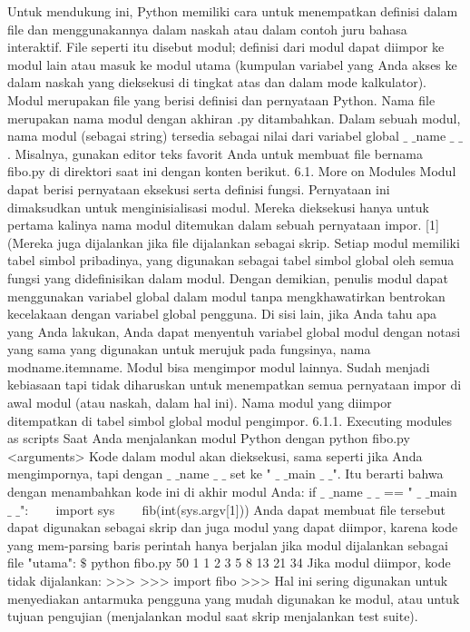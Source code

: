 Untuk mendukung ini, Python memiliki cara untuk menempatkan definisi dalam file dan menggunakannya dalam naskah atau dalam contoh juru bahasa interaktif. File seperti itu disebut modul; definisi dari modul dapat diimpor ke modul lain atau masuk ke modul utama (kumpulan variabel yang Anda akses ke dalam naskah yang dieksekusi di tingkat atas dan dalam mode kalkulator).
Modul merupakan file yang berisi definisi dan pernyataan Python. Nama file merupakan nama modul dengan akhiran .py ditambahkan. Dalam sebuah modul, nama modul (sebagai string) tersedia sebagai nilai dari variabel global  $  \_  $ $  \_  $name $  \_  $ $  \_  $. Misalnya, gunakan editor teks favorit Anda untuk membuat file bernama fibo.py di direktori saat ini dengan konten berikut. 
6.1. More on Modules 
Modul dapat berisi pernyataan eksekusi serta definisi fungsi. Pernyataan ini dimaksudkan untuk menginisialisasi modul. Mereka dieksekusi hanya untuk pertama kalinya nama modul ditemukan dalam sebuah pernyataan impor. [1] (Mereka juga dijalankan jika file dijalankan sebagai skrip.
Setiap modul memiliki tabel simbol pribadinya, yang digunakan sebagai tabel simbol global oleh semua fungsi yang didefinisikan dalam modul. Dengan demikian, penulis modul dapat menggunakan variabel global dalam modul tanpa mengkhawatirkan bentrokan kecelakaan dengan variabel global pengguna. Di sisi lain, jika Anda tahu apa yang Anda lakukan, Anda dapat menyentuh variabel global modul dengan notasi yang sama yang digunakan untuk merujuk pada fungsinya, nama modname.itemname.
Modul bisa mengimpor modul lainnya. Sudah menjadi kebiasaan tapi tidak diharuskan untuk menempatkan semua pernyataan impor di awal modul (atau naskah, dalam hal ini). Nama modul yang diimpor ditempatkan di tabel simbol global modul pengimpor.
6.1.1. Executing modules as scripts 
Saat Anda menjalankan modul Python dengan
python fibo.py <arguments>
Kode dalam modul akan dieksekusi, sama seperti jika Anda mengimpornya, tapi dengan  $  \_  $ $  \_  $name $  \_  $ $  \_  $ set ke " $  \_  $ $  \_  $main $  \_  $ $  \_  $". Itu berarti bahwa dengan menambahkan kode ini di akhir modul Anda:
if  $  \_  $ $  \_  $name $  \_  $ $  \_  $ == " $  \_  $ $  \_  $main $  \_  $ $  \_  $": 
~~~ import sys
~~~ fib(int(sys.argv[1]))
Anda dapat membuat file tersebut dapat digunakan sebagai skrip dan juga modul yang dapat diimpor, karena kode yang mem-parsing baris perintah hanya berjalan jika modul dijalankan sebagai file "utama":
 $  \$  $ python fibo.py 50
1 1 2 3 5 8 13 21 34 
Jika modul diimpor, kode tidak dijalankan: 
>>>
>>> import fibo 
>>> 
Hal ini sering digunakan untuk menyediakan antarmuka pengguna yang mudah digunakan ke modul, atau untuk tujuan pengujian (menjalankan modul saat skrip menjalankan test suite). 
